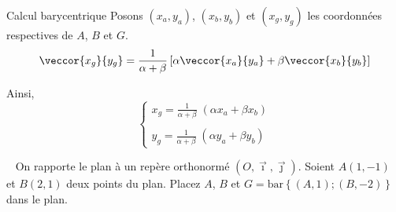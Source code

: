 \begin{chapter}{Calcul barycentrique}
Posons $(x_a , y_a)$, $(x_b , y_b)$ et $(x_g , y_g)$ les coordonn\'ees respectives de $A$, $B$ et $G$.
\begin{equation}
\label{eq:barycentre coordonnees composantes}
\veccor{x_g}{y_g} = \frac{1}{\alpha + \beta} \left[ \alpha  \veccor{x_a}{y_a}  + \beta \veccor{x_b}{y_b} \right]
\end{equation}

Ainsi, 
$$
\left\lbrace
\begin{matrix}
x_g = \frac{1}{\alpha + \beta} \; (\alpha x_a + \beta x_b) \\ 
\\
y_g = \frac{1}{\alpha + \beta} \; (\alpha y_a + \beta y_b) 
\end{matrix}
\right.
$$

\begin{exe} ~ \newline \vspace{-.2cm} \newline
\label{exe:barycentre 1}
%
On rapporte le plan \`a un rep\`ere orthonorm\'e $(O , \vec{\imath} , \vec{\jmath})$. 
Soient $A (1,-1)$ et $B(2,1)$ deux points du plan.
Placez $A$, $B$ et $G = \mathrm{bar}\left\lbrace (A,1) ; (B,-2) \right\rbrace $ 
dans le plan.


\end{exe}
\end{chapter}
